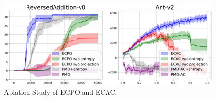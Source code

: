 \begin{figure}[t]
\begin{center}
\includegraphics[width=0.9\linewidth]{./ablation-results.pdf}
\end{center}
\caption{Ablation Study of ECPO and ECAC. }
\label{fig:ablation}
\end{figure}


